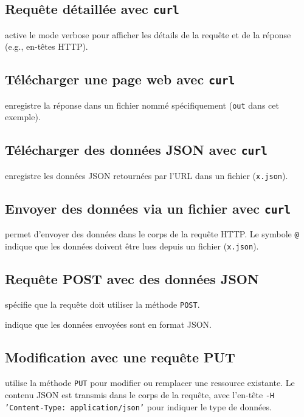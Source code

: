\documentclass[a4paper]{report}
\begin{document}
\subsection{Requête détaillée avec \texttt{curl}}
active le mode verbose pour afficher les détails de la requête et de la réponse 
(e.g., en-têtes HTTP).

\subsection{Télécharger une page web avec \texttt{curl}}
enregistre la réponse dans un fichier nommé spécifiquement (\texttt{out} dans cet 
exemple).

\subsection{Télécharger des données JSON avec \texttt{curl}}
enregistre les données JSON retournées par l'URL dans un fichier (\texttt{x.json}).

\subsection{Envoyer des données via un fichier avec \texttt{curl}}
permet d'envoyer des données dans le corps de la requête HTTP. Le symbole 
\texttt{@} indique que les données doivent être lues depuis un fichier 
(\texttt{x.json}).

\subsection{Requête POST avec des données JSON}
spécifie que la requête doit utiliser la méthode \texttt{POST}. 

\noindent{}
indique que les données envoyées sont en format JSON.

\subsection{Modification avec une requête PUT}
utilise la méthode \texttt{PUT} pour modifier ou remplacer une ressource existante. 
Le contenu JSON est transmis dans le corps de la requête, avec l'en-tête
\texttt{-H 'Content-Type: application/json'} pour indiquer le type de données.
\end{document}

